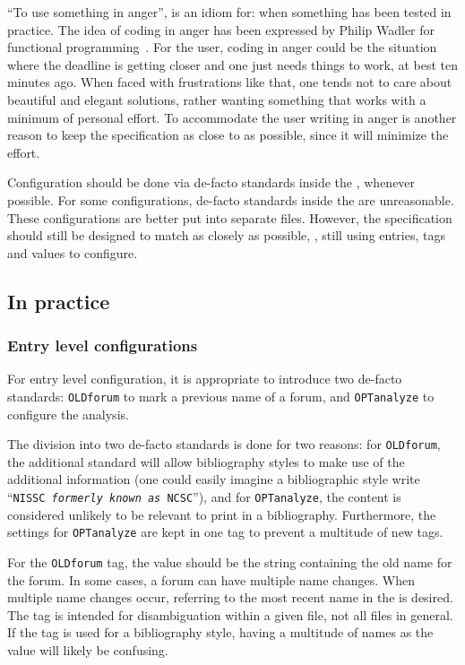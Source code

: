 ``To use something in anger'', is an idiom for: when something has
been tested in practice.  The idea of coding in anger has been
expressed by Philip Wadler for functional
programming~\cite{wadler1997_functional}.  For the {\bibtex} user,
coding in anger could be the situation where the deadline is getting
closer and one just needs things to work, at best ten minutes ago.
When faced with frustrations like that, one tends not to care about
beautiful and elegant solutions, rather wanting something that works
with a minimum of personal effort.  To accommodate the user writing
{\bibtex} in anger is another reason to keep the specification as
close to {\bibtex} as possible, since it will minimize the effort.

Configuration should be done via de-facto standards inside the
, whenever possible.  For some configurations, de-facto
standards inside the  are unreasonable.  These
configurations are better put into separate files.  However, the
specification should still be designed to match {\bibtex} as closely
as possible, \ie, still using entries, tags and values to configure.


\subsection{In practice}
\label{sec:analyzing_in_practice}

\subsubsection{Entry level configurations}

For entry level configuration, it is appropriate to introduce two
de-facto standards: \texttt{OLDforum} to mark a previous name of a
forum, and \texttt{OPTanalyze} to configure the analysis.

The division into two de-facto standards is done for two reasons: for
\texttt{OLDforum}, the additional standard will allow bibliography
styles to make use of the additional information (one could easily
imagine a bibliographic style write ``\texttt{NISSC \textit{formerly
    known as} NCSC}''), and for \texttt{OPTanalyze}, the content is
considered unlikely to be relevant to print in a bibliography.
Furthermore, the settings for \texttt{OPTanalyze} are kept in one tag
to prevent a multitude of new tags.

For the \texttt{OLDforum} tag, the value should be the string
containing the old name for the forum.  In some cases, a forum can
have multiple name changes.  When multiple name changes occur,
referring to the most recent name in the  is desired.  The
tag is intended for disambiguation within a given file, not all files
in general.  If the tag is used for a bibliography style, having a
multitude of names as the value will likely be confusing.

